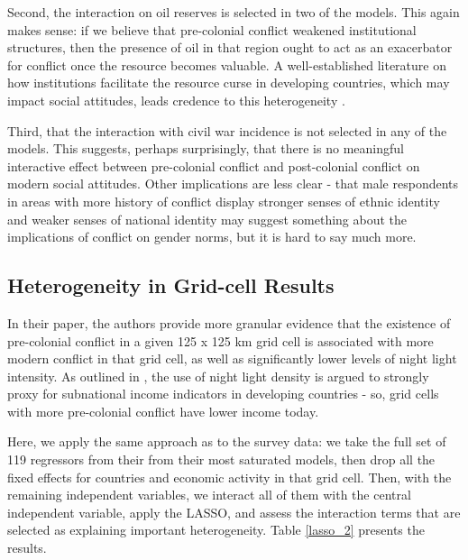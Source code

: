 Second, the interaction on oil reserves is selected in two of the models. This again makes sense: if we believe that pre-colonial conflict weakened institutional structures, then the presence of oil in that region ought to act as an exacerbator for conflict once the resource becomes valuable. A well-established literature on how institutions facilitate the resource curse in developing countries, which may impact social attitudes, leads credence to this heterogeneity \citep{mehlum2006institutions}. 

Third, that the interaction with civil war incidence is not selected in any of the models. This suggests, perhaps surprisingly, that there is no meaningful interactive effect between pre-colonial conflict and post-colonial conflict on modern social attitudes. Other implications are less clear - that male respondents in areas with more history of conflict display stronger senses of ethnic identity and weaker senses of national identity may suggest something about the implications of conflict on gender norms, but it is hard to say much more. 

\subsection{Heterogeneity in Grid-cell Results}

In their paper, the authors provide more granular evidence that the existence of pre-colonial conflict in a given 125 x 125 km grid cell is associated with more modern conflict in that grid cell, as well as significantly lower levels of night light intensity. As outlined in \citet{henderson_measuring_2012}, the use of night light density is argued to strongly proxy for subnational income indicators in developing countries - so, grid cells with more pre-colonial conflict have lower income today. 

Here, we apply the same approach as to the survey data: we take the full set of 119 regressors from their from their most saturated models, then drop all the fixed effects for countries and economic activity in that grid cell. Then, with the remaining independent variables, we interact all of them with the central independent variable, apply the LASSO, and assess the interaction terms that are selected as explaining important heterogeneity. Table \ref{lasso_2} presents the results.

